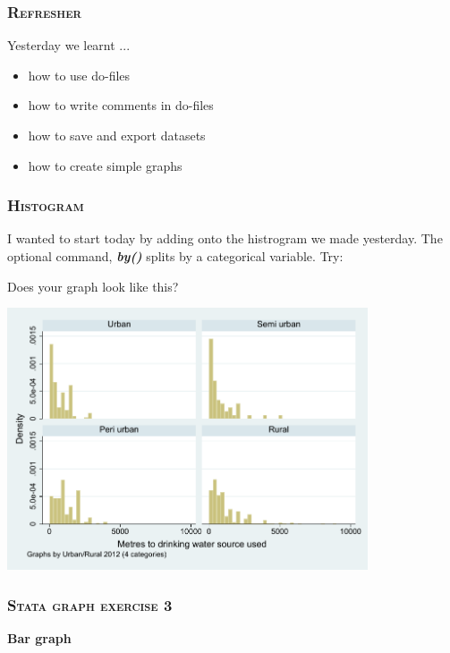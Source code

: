 \documentclass[10pt]{beamer}
\begin{document}
	\begin{frame}
		\frametitle{\textsc{Refresher}}
		Yesterday we learnt ...
		\begin{itemize}
			\item how to use do-files
			\item how to write comments in do-files
			\item how to save and export datasets
			\item how to create simple graphs
		\end{itemize}
	\end{frame}
	
	\begin{frame}
	\frametitle{\textsc{Histogram}}
		 I wanted to start today by adding onto the histrogram we made yesterday.
		\onslide<2-> The optional command, \textbf{\textit{by()}} 
					 splits by a categorical variable. Try:
	
\begin{stlog}\end{stlog}
		 Does your graph look like this?
	
\begin{center}
    \includegraphics[width=0.8\textwidth]{hist_3.pdf}
\end{center}
	\end{frame}
	

	\begin{frame}
	\frametitle{\textsc{Stata graph exercise 3}}
		\begin{center}
		\Large \textbf{Bar graph}
		\end{center}
	\end{frame}		
	
\end{document}
